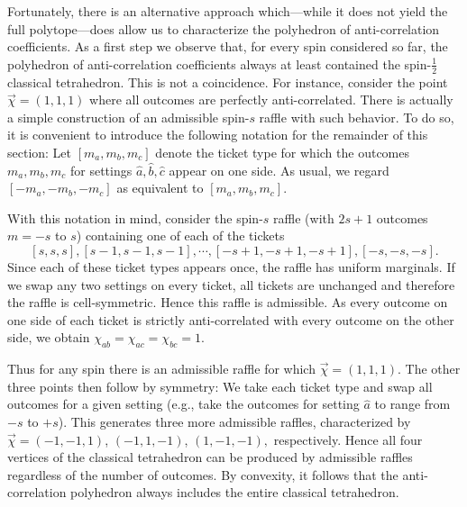 Fortunately, there is an alternative approach which---while it does not yield the full polytope---does allow us to characterize the polyhedron of anti-correlation coefficients. As a first step we observe that, for every spin considered so far, the  polyhedron of anti-correlation coefficients always at least contained the spin-$\frac12$ classical tetrahedron. This is not a  coincidence. For instance, consider the point $\vec{\chi}=(1,1,1)$ where all outcomes are perfectly anti-correlated. There is actually a simple construction of an admissible spin-$s$ raffle with such behavior. To do so, it is convenient to introduce the following notation for the remainder of this section: Let $[m_a,m_b,m_c]$ denote the ticket type for which the outcomes $m_a,m_b,m_c$ for settings $\hat{a},\hat{b},\hat{c}$ appear on one side. As usual, we regard $[-m_a,-m_b,-m_c]$ as equivalent to $[m_a,m_b,m_c]$.

With this notation in mind, consider the spin-$s$ raffle (with $2s+1$ outcomes $m=-s$ to $s$) containing one of each of the tickets $$[s,s,s], [s-1,s-1,s-1], \cdots, [-s+1,-s+1,-s+1], [-s,-s,-s].$$ Since each of these ticket types appears once, the raffle has uniform marginals. If we swap any two settings on every ticket, all tickets are unchanged and therefore the raffle is cell-symmetric. Hence this raffle is admissible. As every outcome on one side of each ticket is strictly anti-correlated with every outcome on the other side, we obtain $\chi_{ab}=\chi_{ac}=\chi_{bc}=1$.

Thus for any spin there is an admissible raffle for which $\vec{\chi}=(1,1,1)$. The other three points then follow by symmetry: We take each ticket type and swap all outcomes for a given setting (e.g., take the outcomes for setting $\hat{a}$ to range from $-s$ to $+s$). This generates three more admissible raffles, characterized by $\vec{\chi}=(-1,-1,1)$, $(-1,1,-1)$, $(1,-1,-1),$ respectively. Hence all four vertices of the classical tetrahedron can be produced by admissible raffles regardless of the number of outcomes. By convexity, it follows that the anti-correlation polyhedron always includes the entire classical tetrahedron.

